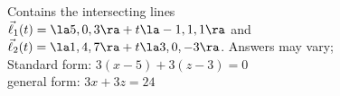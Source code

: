 {Contains the intersecting lines\\
$\vec\ell_1(t) = \la 5,0,3\ra + t\la -1,1,1\ra$ and \\
$\vec\ell_2(t) = \la 1,4,7\ra + t\la 3,0,-3\ra$.
}
{Answers may vary;\\
Standard form: $3(x-5)+3(z-3)=0$\\
general form: $3x+3z=24$
}

